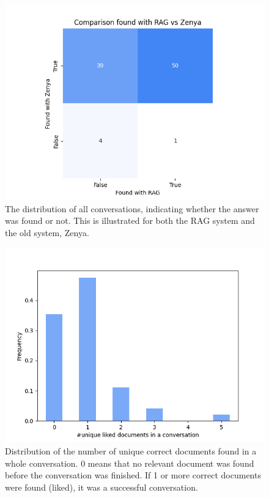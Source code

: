 \begin{figure}[H]
    \centerline{\includegraphics[width=0.9\linewidth]{fig/RAG_found_plot.png}}
    \caption{The distribution of all conversations, indicating whether the answer was found or not. This is illustrated for both the RAG system and the old system, Zenya.}
    \label{fig:found_rate}
\end{figure}

\begin{figure}[H]
    \centerline{\includegraphics[width=0.7\linewidth]{fig/RAG_nr_correct_in_conversation.png}}
    \caption{Distribution of the number of unique correct documents found in a whole conversation. 0 means that no relevant document was found before the conversation was finished. If 1 or more correct documents were found (liked), it was a successful conversation.}
    \label{fig:liked_docs_per_convo}
\end{figure}

